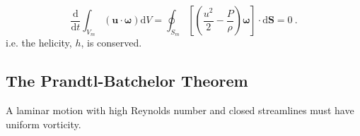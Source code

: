 \documentclass[12pt,a4paper]{article}
\renewcommand{\vec}[1]{\boldsymbol{#1}}
\newcommand{\dif}{\mathrm{d}}
\begin{document}
\begin{equation}
\frac{\dif }{\dif t} \int_{V_m} (\vec{u}\cdot \vec{\omega}) \dif V= \oint_{S_m} \left[ \left(\frac{u^2}{2} -\frac{P}{\rho} \right)\vec{\omega} \right] \cdot \dif \vec{S} = 0 ~.
\end{equation}
i.e. the helicity, $h$, is conserved.































































\subsection{The Prandtl-Batchelor Theorem}
 A laminar motion with high Reynolds number and closed streamlines must have uniform vorticity.
\end{document}

